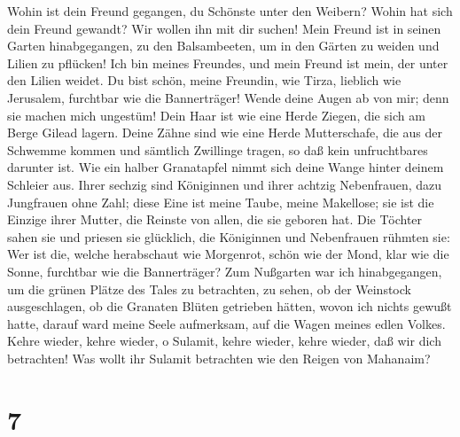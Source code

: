  Wohin ist dein Freund gegangen, du Schönste unter den
Weibern? Wohin hat sich dein Freund gewandt? Wir wollen ihn mit dir
suchen!  Mein Freund ist in seinen Garten hinabgegangen,
zu den Balsambeeten, um in den Gärten zu weiden und Lilien zu pflücken!
 Ich bin meines Freundes, und mein Freund ist mein, der
unter den Lilien weidet.  Du bist schön, meine Freundin,
wie Tirza, lieblich wie Jerusalem, furchtbar wie die Bannerträger!
 Wende deine Augen ab von mir; denn sie machen mich
ungestüm! Dein Haar ist wie eine Herde Ziegen, die sich am Berge Gilead
lagern.  Deine Zähne sind wie eine Herde Mutterschafe, die
aus der Schwemme kommen und sämtlich Zwillinge tragen, so daß kein
unfruchtbares darunter ist.  Wie ein halber Granatapfel
nimmt sich deine Wange hinter deinem Schleier aus.  Ihrer
sechzig sind Königinnen und ihrer achtzig Nebenfrauen, dazu Jungfrauen
ohne Zahl;  diese Eine ist meine Taube, meine Makellose;
sie ist die Einzige ihrer Mutter, die Reinste von allen, die sie geboren
hat. Die Töchter sahen sie und priesen sie glücklich, die Königinnen und
Nebenfrauen rühmten sie:  Wer ist die, welche herabschaut
wie Morgenrot, schön wie der Mond, klar wie die Sonne, furchtbar wie die
Bannerträger?  Zum Nußgarten war ich hinabgegangen, um
die grünen Plätze des Tales zu betrachten, zu sehen, ob der Weinstock
ausgeschlagen, ob die Granaten Blüten getrieben hätten, 
wovon ich nichts gewußt hatte, darauf ward meine Seele aufmerksam, auf
die Wagen meines edlen Volkes.  Kehre wieder, kehre
wieder, o Sulamit, kehre wieder, kehre wieder, daß wir dich betrachten!
Was wollt ihr Sulamit betrachten wie den Reigen von Mahanaim?

\hypertarget{section-6}{%
\section{7}\label{section-6}}

